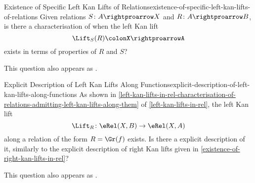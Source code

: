 \begin{question}{Existence of Specific Left Kan Lifts of Relations}{existence-of-specific-left-kan-lifts-of-relations}%
    Given relations $S\colon A\rightproarrow X$ and $R\colon A\rightproarrow B$, is there a characterisation of when the left Kan lift
    \[
        \Lift_{S}(R)%
        \colon%
        X%
        \rightproarrow%
        A%
    \]%
    exists in terms of properties of $R$ and $S$?

    This question also appears as \cite{MO461592}.
\end{question}
\begin{question}{Explicit Description of Left Kan Lifts Along Functions}{explicit-description-of-left-kan-lifts-along-functions}%
    As shown in \cref{left-kan-lifts-in-rel-characterisation-of-relations-admitting-left-kan-lifts-along-them} of \cref{left-kan-lifts-in-rel}, the left Kan lift
    \[
        \Lift_{R}%
        \colon%
        \eRel(X,B)%
        \to%
        \eRel(X,A)%
    \]%
    along a relation of the form $R=\Gr(f)$ exists. Is there a explicit description of it, similarly to the explicit description of right Kan lifts given in \cref{existence-of-right-kan-lifts-in-rel}?

    This question also appears as \cite{MO461592}.
\end{question}

